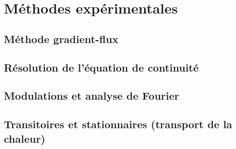 \chapter{Méthodes expérimentales}

		\section{Méthode gradient-flux}

		\section{Résolution de l'équation de continuité}

		\section{Modulations et analyse de Fourier}
		
		\section{Transitoires et stationnaires (transport de la chaleur)}
